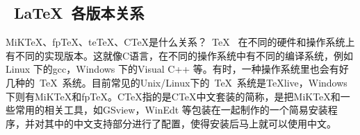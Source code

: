 \subsection{~\LaTeX{}~各版本关系}
MiKTeX、fpTeX、teTeX、CTeX是什么关系？~\TeX{}~ 在不同的硬件和操作系统上有不同的实现版本。这就像C语言，在不同的操作系统中有不同的编译系统，例如Linux 下的gcc，Windows 下的Visual C++ 等。有时，一种操作系统里也会有好几种的~\TeX{}~系统。目前常见的Unix/Linux下的~\TeX{}~系统是TeXlive，Windows下则有MiKTeX和fpTeX。CTeX指的是CTeX中文套装的简称，是把MiKTeX和一些常用的相关工具，如GSview，WinEdt 等包装在一起制作的一个简易安装程序，并对其中的中文支持部分进行了配置，使得安装后马上就可以使用中文。